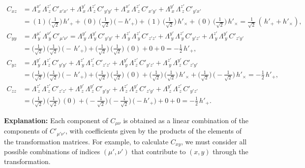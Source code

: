 \documentclass{article}
\begin{document}
\begin{align*}
C_{xz}
&= \Lambda^{x'}_{\;x}\,\Lambda^{z'}_{\;z}\,C'_{x'x'}
+ \Lambda^{y'}_{\;x}\,\Lambda^{z'}_{\;z}\,C'_{y'y'}
+ \Lambda^{x'}_{\;x}\,\Lambda^{z'}_{\;z}\,C'_{x'y'}
+ \Lambda^{y'}_{\;x}\,\Lambda^{z'}_{\;z}\,C'_{y'x'} \\
&= (1)\,\bigl(\tfrac{1}{\sqrt{2}}\bigr)\,h'_{+}
+ (0)\,\bigl(\tfrac{1}{\sqrt{2}}\bigr)\,\bigl(-h'_{+}\bigr)
+ (1)\,\bigl(\tfrac{1}{\sqrt{2}}\bigr)\,h'_{\times}
+ (0)\,\bigl(\tfrac{1}{\sqrt{2}}\bigr)\,h'_{\times}
= \tfrac{1}{\sqrt{2}}\,(\,h'_{+} + h'_{\times}), \\[6pt]
C_{yy}
&= \Lambda^{\mu'}_{\;y}\,\Lambda^{\nu'}_{\;y}\,C'_{\mu'\nu'}
= \Lambda^{y'}_{\;y}\,\Lambda^{y'}_{\;y}\,C'_{y'y'}
+ \Lambda^{z'}_{\;y}\,\Lambda^{z'}_{\;y}\,C'_{z'z'}
+ \Lambda^{y'}_{\;y}\,\Lambda^{z'}_{\;y}\,C'_{y'z'}
+ \Lambda^{z'}_{\;y}\,\Lambda^{y'}_{\;y}\,C'_{z'y'} \\
&= \bigl(\tfrac{1}{\sqrt{2}}\bigr)\,\bigl(\tfrac{1}{\sqrt{2}}\bigr)\,\bigl(-\,h'_{+}\bigr)
+ \bigl(\tfrac{1}{\sqrt{2}}\bigr)\,\bigl(\tfrac{1}{\sqrt{2}}\bigr)\,(0)
+ 0 + 0
= -\tfrac{1}{2}\,h'_{+}, \\[6pt]
C_{yz}
&= \Lambda^{y'}_{\;y}\,\Lambda^{z'}_{\;z}\,C'_{y'y'}
+ \Lambda^{z'}_{\;y}\,\Lambda^{z'}_{\;z}\,C'_{z'z'}
+ \Lambda^{y'}_{\;y}\,\Lambda^{z'}_{\;z}\,C'_{y'z'}
+ \Lambda^{z'}_{\;y}\,\Lambda^{y'}_{\;z}\,C'_{z'y'} \\
&= \bigl(\tfrac{1}{\sqrt{2}}\bigr)\,\bigl(\tfrac{1}{\sqrt{2}}\bigr)\,\bigl(-\,h'_{+}\bigr)
+ \bigl(\tfrac{1}{\sqrt{2}}\bigr)\,\bigl(\tfrac{1}{\sqrt{2}}\bigr)\,(0)
+ \bigl(\tfrac{1}{\sqrt{2}}\bigr)\,\bigl(\tfrac{1}{\sqrt{2}}\bigr)\,h'_{\times}
+ \bigl(\tfrac{1}{\sqrt{2}}\bigr)\,\bigl(-\tfrac{1}{\sqrt{2}}\bigr)\,h'_{\times}
= -\tfrac{1}{2}\,h'_{+}, \\[6pt]
C_{zz}
&= \Lambda^{z'}_{\;z}\,\Lambda^{z'}_{\;z}\,C'_{z'z'}
+ \Lambda^{y'}_{\;z}\,\Lambda^{y'}_{\;z}\,C'_{y'y'}
+ \Lambda^{z'}_{\;z}\,\Lambda^{y'}_{\;z}\,C'_{z'y'}
+ \Lambda^{y'}_{\;z}\,\Lambda^{z'}_{\;z}\,C'_{y'z'} \\
&= \bigl(\tfrac{1}{\sqrt{2}}\bigr)\,\bigl(\tfrac{1}{\sqrt{2}}\bigr)\,(0)
+ \bigl(-\tfrac{1}{\sqrt{2}}\bigr)\,\bigl(-\tfrac{1}{\sqrt{2}}\bigr)\,\bigl(-h'_{+}\bigr)
+ 0 + 0
= -\tfrac{1}{2}\,h'_{+}.
\end{align*}

\textbf{Explanation:}
Each component of $C_{\mu\nu}$ is obtained as a linear combination of the components of $C'_{\mu'\nu'}$, with coefficients given by the products of the elements of the transformation matrices. For example, to calculate $C_{xy}$, we must consider all possible combinations of indices $(\mu',\nu')$ that contribute to $(x,y)$ through the transformation.
\end{document}
